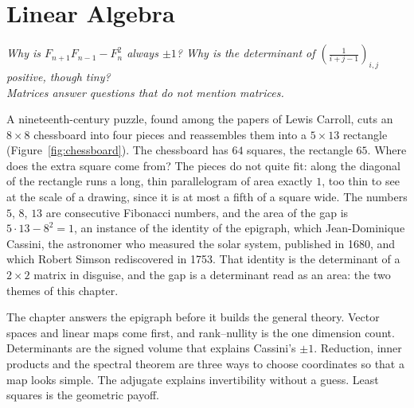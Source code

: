 \chapter{Linear Algebra}\label{ch:linear}

\begin{center}\itshape
Why is $F_{n+1}F_{n-1}-F_n^2$ always $\pm1$? Why is the determinant of $\left(\frac1{i+j-1}\right)_{i,j}$ positive, though tiny?\\
Matrices answer questions that do not mention matrices.
\end{center}

A nineteenth-century puzzle, found among the papers of Lewis Carroll, cuts an $8\times8$ chessboard into four pieces and reassembles them into a
$5\times13$ rectangle (Figure~\ref{fig:chessboard}). The chessboard has $64$ squares, the rectangle $65$. Where does the extra square come from? The
pieces do not quite fit: along the diagonal of the rectangle runs a long, thin parallelogram of area exactly $1$, too thin to see at the scale of a
drawing, since it is at most a fifth of a square wide. The numbers $5$, $8$, $13$ are consecutive Fibonacci numbers, and the area of the gap is
$5\cdot13-8^2=1$, an instance of the identity of the epigraph, which Jean-Dominique Cassini, the astronomer who measured the solar system, published in
1680, and which Robert Simson rediscovered in 1753. That identity is the determinant of a $2\times2$ matrix in disguise, and the gap is a determinant
read as an area: the two themes of this chapter.

The chapter answers the epigraph before it builds the general theory. Vector spaces and linear maps come first, and rank--nullity is the one dimension count. Determinants are the signed volume that explains Cassini's $\pm 1$. Reduction, inner products and the spectral theorem are three ways to choose coordinates so that a map looks simple. The adjugate explains invertibility without a guess. Least squares is the geometric payoff.

